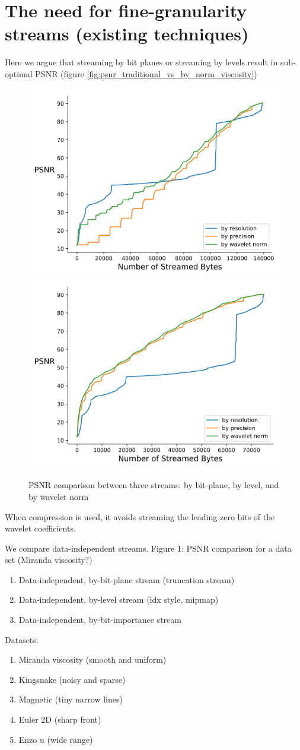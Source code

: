 \section{The need for fine-granularity streams (existing techniques)}
Here we argue that streaming by bit planes or streaming by levels result in sub-optimal PSNR (figure \ref{fig:psnr_traditional_vs_by_norm_viscosity})

\begin{figure}[t]
	\centering
	{\includegraphics[width=0.4\linewidth]{resources/rmse-miranda-viscosity.png}}
	{\includegraphics[width=0.4\linewidth]{resources/rmse-miranda-viscosity_slz.png}}
	\caption {PSNR comparison between three streams: by bit-plane, by level, and by wavelet norm}
	\label{fig:file_zero}
\end{figure}

When compression is used, it avoids streaming the leading zero bits of the wavelet coefficients.

We compare data-independent streams. Figure 1: PSNR comparison for a data set (Miranda viscosity?)
\begin{enumerate}
  \item Data-independent, by-bit-plane stream (truncation stream)
  \item Data-independent, by-level stream (idx style, mipmap)
  \item Data-independent, by-bit-importance stream
\end{enumerate}

Datasets:
\begin{enumerate}
  \item Miranda viscosity (smooth and uniform)
  \item Kingsnake (noisy and sparse)
  \item Magnetic (tiny narrow lines)
  \item Euler 2D (sharp front)
  \item Enzo u (wide range)
\end{enumerate}

